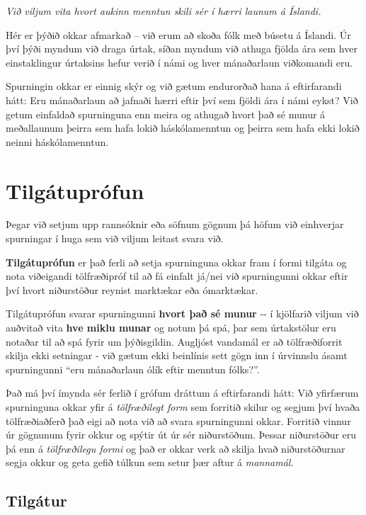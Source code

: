 \documentclass[
]{book}
\begin{document}
\emph{Við viljum vita hvort aukinn menntun skili sér í hærri launum á Íslandi.}

Hér er þýðið okkar afmarkað -- við erum að skoða fólk með búsetu á Íslandi. Úr því þýði myndum við draga úrtak, síðan myndum við athuga fjölda ára sem hver einstaklingur úrtaksins hefur verið í námi og hver mánaðarlaun viðkomandi eru.

Spurningin okkar er einnig skýr og við gætum endurorðað hana á eftirfarandi hátt: Eru mánaðarlaun að jafnaði hærri eftir því sem fjöldi ára í námi eykst? Við getum einfaldað spurninguna enn meira og athugað hvort það sé munur á meðallaunum þeirra sem hafa lokið háskólamenntun og þeirra sem hafa ekki lokið neinni háskólamenntun.

\hypertarget{tilguxe1tupruxf3fun}{%
\chapter{Tilgátuprófun}\label{tilguxe1tupruxf3fun}}

Þegar við setjum upp rannsóknir eða söfnum gögnum þá höfum við
einhverjar spurningar í huga sem við viljum leitast svara við.

\textbf{Tilgátuprófun} er það ferli að setja spurninguna okkar fram í formi
tilgáta og nota viðeigandi tölfræðipróf til að fá einfalt já/nei við
spurningunni okkar eftir því hvort niðurstöður reynist marktækar eða
ómarktækar.

Tilgátuprófun svarar spurningunni \textbf{hvort það sé munur} -\/- í kjölfarið
viljum við auðvitað vita \textbf{hve miklu munar} og notum þá spá, þar sem
úrtakstölur eru notaðar til að spá fyrir um þýðisgildin. Augljóst
vandamál er að tölfræðiforrit skilja ekki setningar - við gætum ekki
beinlínis sett gögn inn í úrvinnslu ásamt spurningunni ``eru mánaðarlaun
ólík eftir menntun fólks?''.

Það má því ímynda sér ferlið í grófum dráttum á eftirfarandi hátt: Við
yfirfærum spurninguna okkar yfir á \emph{tölfræðilegt form} sem forritið
skilur og segjum því hvaða tölfræðiaðferð það eigi að nota við að svara
spurningunni okkar. Forritið vinnur úr gögnunum fyrir okkur og spýtir út
úr sér niðurstöðum. Þessar niðurstöður eru þá enn á \emph{tölfræðilegu formi}
og það er okkar verk að skilja hvað niðurstöðurnar segja okkur og geta
gefið túlkun sem setur þær aftur á \emph{mannamál}.

\hypertarget{cross}{%
\section{Tilgátur}\label{cross}}
\end{document}
